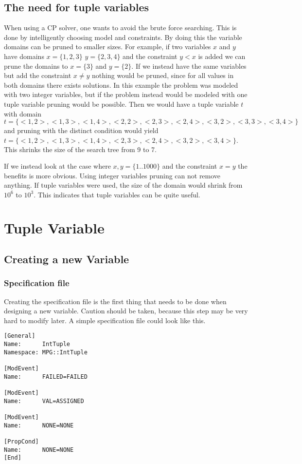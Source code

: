 \documentclass[a4paper,11pt]{article}
\begin{document}
\subsection{The need for tuple variables}
When using a CP solver, one wants to avoid the brute force searching. This is done by intelligently choosing model and constraints. By doing this the variable domains can be pruned to smaller sizes. For example, if two variables $x$ and $y$ have domains $x=\{1,2,3\}$ $y=\{2,3,4\}$ and the constraint $y<x$ is added we can prune the domains to $x=\{3\}$ and $y=\{2\}$. If we instead have the same variables but add the constraint $x\neq y$ nothing would be pruned, since for all values in both domains there exists solutions. In this example the problem was modeled with two integer variables, but if the problem instead would be modeled with one tuple variable pruning would be possible. Then we would have a tuple variable $t$ with domain $t=\{<1,2>,<1,3>,<1,4>,<2,2>,<2,3>,<2,4>,<3,2>,<3,3>,<3,4>\}$ and pruning with the distinct condition would yield $t=\{<1,2>,<1,3>,<1,4>,<2,3>,<2,4>,<3,2>,<3,4>\}$. This shrinks the size of the search tree from 9 to 7. 

If we instead look at the case where $x,y=\{1..1000\}$ and the constraint $x=y$ the benefits is more obvious. Using integer variables pruning can not remove anything. If tuple variables were used, the size of the domain would shrink from $10^6$ to $10^3$. This indicates that tuple variables can be quite useful.

\section{Tuple Variable}

\subsection{Creating a new Variable}
\subsubsection{Specification file}
Creating the specification file is the first thing that needs to be done when designing a new variable. Caution should be taken, because this step may be very hard to modify later. A simple specification file could look like this.

\begin{lstlisting}[frame=single]
[General]
Name:      IntTuple
Namespace: MPG::IntTuple

[ModEvent]
Name:      FAILED=FAILED

[ModEvent]
Name:      VAL=ASSIGNED

[ModEvent]
Name:      NONE=NONE

[PropCond]
Name:      NONE=NONE
[End]
\end{lstlisting}
\end{document}
